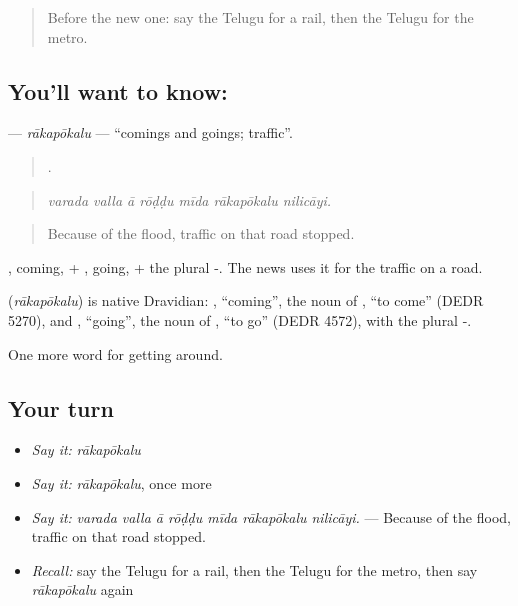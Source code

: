 \label{lesson:TE-C442-rakapokalu}



\begin{quote}
Before the new one: say the Telugu for a rail, then the Telugu for the metro.
\end{quote}

\subsection*{You'll want to know: }
\textbf{} — \emph{rākapōkalu} — \textquotedblleft{}comings and goings; traffic\textquotedblright{}.

\begin{quote}
      .
\end{quote}

\begin{quote}
\emph{varada valla ā rōḍḍu mīda rākapōkalu nilicāyi.}
\end{quote}

\begin{quote}
Because of the flood, traffic on that road stopped.
\end{quote}

, coming, + , going, + the plural -. The news uses it for the traffic on a road.

\begin{cousinweb}
\textbf{} (\emph{rākapōkalu}) is native Dravidian: , \textquotedblleft{}coming\textquotedblright{}, the noun of , \textquotedblleft{}to come\textquotedblright{} (DEDR 5270), and , \textquotedblleft{}going\textquotedblright{}, the noun of , \textquotedblleft{}to go\textquotedblright{} (DEDR 4572), with the plural -.
\end{cousinweb}

\begin{grammarlens}[title={What you've built}]
One more word for getting around.
\end{grammarlens}

\subsection*{Your turn}
\begin{itemize}
\raggedright
  \item \emph{Say it:} \emph{rākapōkalu}
  \item \emph{Say it:} \emph{rākapōkalu}, once more
  \item \emph{Say it:} \emph{varada valla ā rōḍḍu mīda rākapōkalu nilicāyi.} — Because of the flood, traffic on that road stopped.
  \item \emph{Recall:} say the Telugu for a rail, then the Telugu for the metro, then say \emph{rākapōkalu} again
\end{itemize}

